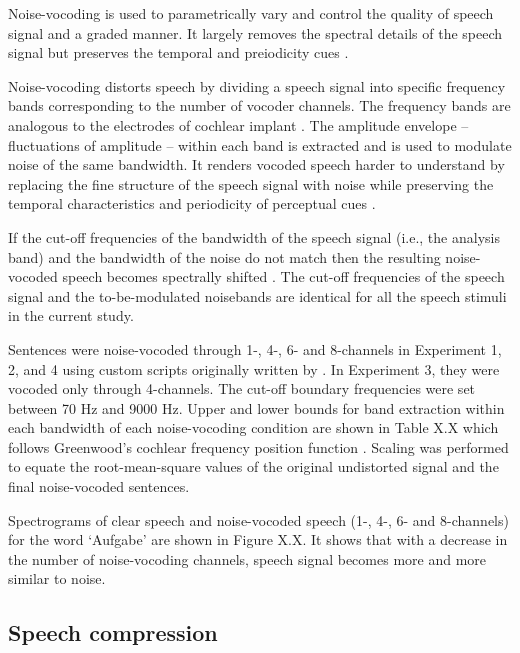 \documentclass[a4paper, nobind]{templates/ociamthesis}
\begin{document}
Noise-vocoding is used to parametrically vary and control the quality of speech signal and a graded manner.
It largely removes the spectral details of the speech signal but preserves the temporal and preiodicity cues \autocite{Rosen1999}.

Noise-vocoding distorts speech by dividing a speech signal into specific frequency bands corresponding to the number of vocoder channels.
The frequency bands are analogous to the electrodes of cochlear implant \autocite{Shannon1995,Loizou1999,Shannon2004}.
The amplitude envelope -- fluctuations of amplitude -- within each band is extracted and is used to modulate noise of the same bandwidth.
It renders vocoded speech harder to understand by replacing the fine structure of the speech signal with noise while preserving the temporal characteristics and periodicity of perceptual cues \autocite{Rosen1999}.

If the cut-off frequencies of the bandwidth of the speech signal (i.e., the analysis band) and the bandwidth of the noise do not match then the resulting noise-vocoded speech becomes spectrally shifted \autocite[e.g.,][]{Faulkner2012}.
The cut-off frequencies of the speech signal and the to-be-modulated noisebands are identical for all the speech stimuli in the current study.

Sentences were noise-vocoded through 1-, 4-, 6- and 8-channels in Experiment 1, 2, and 4 using custom scripts originally written by \textcite{Darwin2005}.
In Experiment 3, they were vocoded only through 4-channels.
The cut-off boundary frequencies were set between 70 Hz and 9000 Hz.
Upper and lower bounds for band extraction within each bandwidth of each noise-vocoding condition are shown in Table X.X which follows Greenwood's cochlear frequency position function \autocite{Greenwood1990,Erb2014}.
Scaling was performed to equate the root-mean-square values of the original undistorted signal and the final noise-vocoded sentences.

Spectrograms of clear speech and noise-vocoded speech (1-, 4-, 6- and 8-channels) for the word `Aufgabe' are shown in Figure X.X. It shows that with a decrease in the number of noise-vocoding channels, speech signal becomes more and more similar to noise.

\hypertarget{speech-compression}{%
\subsection{Speech compression}\label{speech-compression}}
\end{document}

